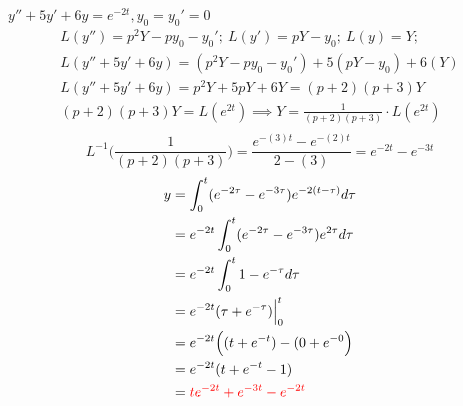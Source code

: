 \item[14.] $y'' + 5y'+ 6y= e^{-2t}, y_0 = y_0' = 0$
\begin{gather*}
    L(y'')=p^2Y-py_0-y_0';\:
    L(y')=pY-y_0;\:
    L(y)=Y;\:\\
    L(y'' + 5y'+ 6y)=(p^2Y-py_0-y_0')+5(pY-y_0)+6(Y)\\
    L(y'' + 5y'+ 6y)=p^2Y+5pY+6Y=(p+2)(p+3)Y\\
    (p+2)(p+3)Y=L(e^{2t}) \implies Y=\frac{1}{(p+2)(p+3)}\cdot L(e^{2t})\\
\end{gather*}
\begin{equation*}
    L^{-1}\Bigg(\frac{1}{(p+2)(p+3)} \Bigg) 
    = \frac{e^{-(3)t}-e^{-(2)t}}{2-(3)}=e^{-2t}-e^{-3t}
    \tag{By \( L7 \)}
\end{equation*}
\begin{align*}
    y 
    & = \int^t_0 (e^{-2\tau}-e^{-3\tau})e^{-2(t-\tau)}d\tau\\
    & = e^{-2t}\int^t_0 (e^{-2\tau}-e^{-3\tau})e^{2\tau}d\tau\\
    & = e^{-2t}\int^t_0 1-e^{-\tau}d\tau\\
    & = e^{-2t}(\tau+e^{-\tau})\Big|^t_0\\
    & = e^{-2t}\Big((t+e^{-t})-(0+e^{-0}\Big)\\
    & = e^{-2t}(t+e^{-t}-1)\\
    & = \textcolor{red}{te^{-2t}+e^{-3t}-e^{-2t}}\\
\end{align*}